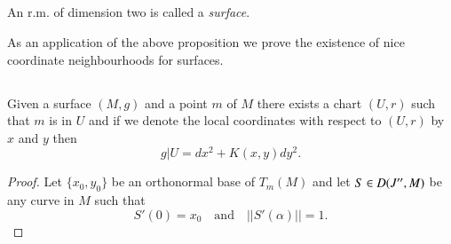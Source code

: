 \subsection{}\label{chap5:5.6.4}

\begin{defi*}
An r.m\@. of dimension two is called a {\em surface}.

As an application of the above proposition we prove the existence of
nice coordinate neighbourhoods for surfaces.
\end{defi*}

\subsection{}\label{chap5:5.6.5}


\begin{application*}
Given a surface $(M,g)$ and a point $m$ of $M$ there exists a chart
$(U,r)$ such that $m$ is in $U$ and if we denote the local coordinates
with respect to $(U,r)$ by $x$ and $y$ then
$$
g|U=dx^{2}+K(x,y)dy^{2}.
$$
\end{application*}

\begin{proof}
Let $\{x_{0},y_{0}\}$ be an orthonormal base of $T_{m}(M)$ and let
$S\in\unskip\break D(J'',M)$ be any curve in $M$ such that
\begin{equation*}
S'(0)=x_{0}\quad\text{and}\quad ||S'(\alpha)||=1.\tag{5.6.6}\label{chap5:5.6.6}
\end{equation*}
\end{proof}

\setcounter{subsection}{6}
